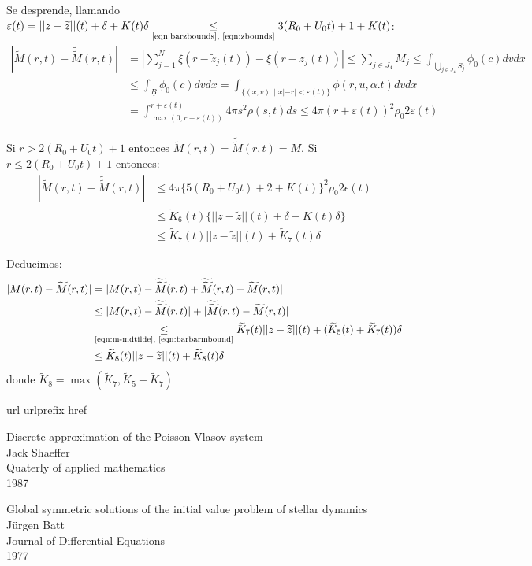 \documentclass[a4paper,10pt]{scrartcl}
\theoremstyle{definition}
\newcommand{\ktilde}{\widetilde{K}}
\newcommand{\dtilde}[1]{\widetilde{\widetilde{#1}}}
\numberwithin{equation}{section}
\begin{document}
 Se desprende, llamando $\varepsilon(t) = ||z-\widetilde{z}||(t) + \delta + K(t)\delta \underset{\textrm{\eqref{eqn:barzbounds}, \eqref{eqn:zbounds}}}{\le} 3(R_0 + U_0 t) + 1 + K(t)$:
 \begin{align*}
 |\widetilde{M}(r,t) - \dtilde{M}(r,t)| &= \left|\sum_{j=1}^N \xi(r - \widetilde{z}_j(t)) - \xi(r - z_j(t)) \right| \le \sum_{j\in J_4} M_j
 \le \int_{\bigcup_{j\in J_4} S_j} \phi_0(c) dv dx\\
 &\le \int_{\underline{B}} \phi_0(c) dv dx
 = \int_{\{(x,v):||x| - r| < \varepsilon(t)\}} \phi(r,u,\alpha.t) dv dx \\
 &= \int_{\max(0,r-\varepsilon(t))}^{r+\varepsilon(t)} 4\pi s^2 \rho(s,t) ds \le 4\pi(r + \varepsilon(t))^2 \rho_0 2\varepsilon(t)
 \end{align*}
 
 Si $r > 2(R_0 + U_0t) + 1$ entonces $\widetilde{M}(r,t) = \dtilde{M}(r,t) = M$. Si $r \le 2(R_0 + U_0t) + 1$ entonces:
 \begin{align}
  |\widetilde{M}(r,t) - \dtilde{M}(r,t)| &\le 4\pi\bigg\{5(R_0 + U_0t) + 2 + K(t)\bigg\}^2 \rho_0 2\epsilon(t) \nonumber\\
  &\le \ktilde_6(t)\bigg\{||z-\widetilde{z}||(t) + \delta + K(t)\delta\bigg\} 
  \nonumber \\
  &\le \ktilde_7(t)||z - \widetilde{z}||(t) + \ktilde_7(t)\delta \label{eqn:barbarmbound}
 \end{align}
 
 Deducimos:
 \begin{align}
  |M(r,t) - \widetilde{M}(r,t)| &= |M(r,t) - \dtilde{M}(r,t) + \dtilde{M}(r,t) - \widetilde{M}(r,t)| \nonumber\\
  &\le |M(r,t) - \dtilde{M}(r,t)| + |\dtilde{M}(r,t) - \widetilde{M}(r,t)| \nonumber\\
  &\underset{\textrm{\eqref{eqn:m-mdtilde}, \eqref{eqn:barbarmbound}}}{\le} \ktilde_7(t)||z - \widetilde{z}||(t) + (\ktilde_5(t)+\ktilde_7(t))\delta \nonumber\\
  &\le \ktilde_8(t)||z - \widetilde{z}||(t) + \ktilde_8(t)\delta
 \end{align}
donde $\ktilde_8 = \max(\ktilde_7, \ktilde_5 + \ktilde_7)$

\newpage
\begin{thebibliography}{10}
    \expandafter\ifx\csname url\endcsname\relax
    \def\url#1{\texttt{#1}}\fi
    \expandafter\ifx\csname urlprefix\endcsname\relax\def\urlprefix{URL }\fi
    \expandafter\ifx\csname href\endcsname\relax
    \def\href#1#2{#2} \def\path#1{#1}\fi
    
    Discrete approximation of the Poisson-Vlasov system\\
    Jack Shaeffer\\
    Quaterly of applied mathematics\\
    1987
    
    Global symmetric solutions of the initial value problem of stellar dynamics\\
    Jürgen Batt\\
    Journal of Differential Equations\\
    1977
\end{thebibliography}
	
\end{document}
